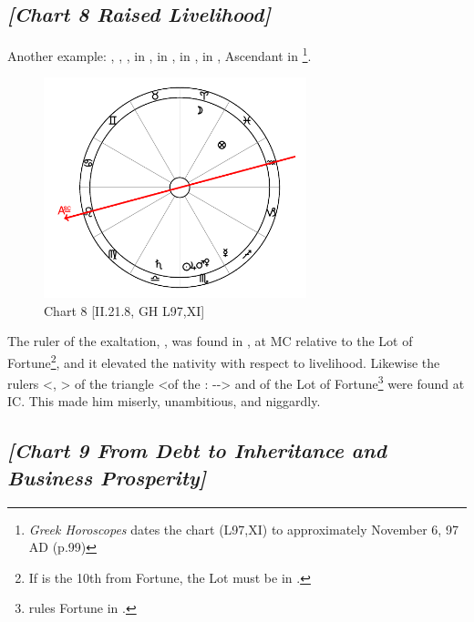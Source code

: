 \subsection*{\textit{[Chart 8 Raised Livelihood]}}

Another example: \Sun, \Jupiter, \Mars, \Venus in \Scorpio, \Saturn\xspace in \Libra, \Moon\xspace in \Aries, \Mercury\xspace in \Sagittarius, Ascendant in \Leo
\footnote{\textit{Greek Horoscopes} dates the chart (L97,XI) to approximately November 6, 97 AD (p.99)}.

\clearpage
\begin{figure}
\centering
\vspace{-20pt}
\includegraphics[width=0.68\textwidth]{charts/2_21_8}
\caption{Chart 8 [II.21.8, GH L97,XI]}
\label{fig:chart08}
\end{figure}

The ruler of the exaltation, \Mercury, was found in \Sagittarius, at MC relative to the Lot of Fortune\footnote{If \Sagittarius\xspace is the 10th from Fortune, the Lot must be in \Pisces.}, and it elevated the nativity with respect to livelihood. Likewise the rulers <\Sun, \Jupiter> of the triangle <of the \Sun: \Aries-\Leo-\Sagittarius> and of the Lot of Fortune\footnote{\Jupiter\xspace rules Fortune in \Pisces.} were found at IC. This made him miserly, unambitious, and niggardly.

\newpage
\subsection*{\textit{[Chart 9 From Debt to Inheritance and Business Prosperity]}}
\addcontentsline{toc}{subsection}{\textit{[Chart 9 [GH L95] From Debt to Inheritance and Business Prosperity}}

